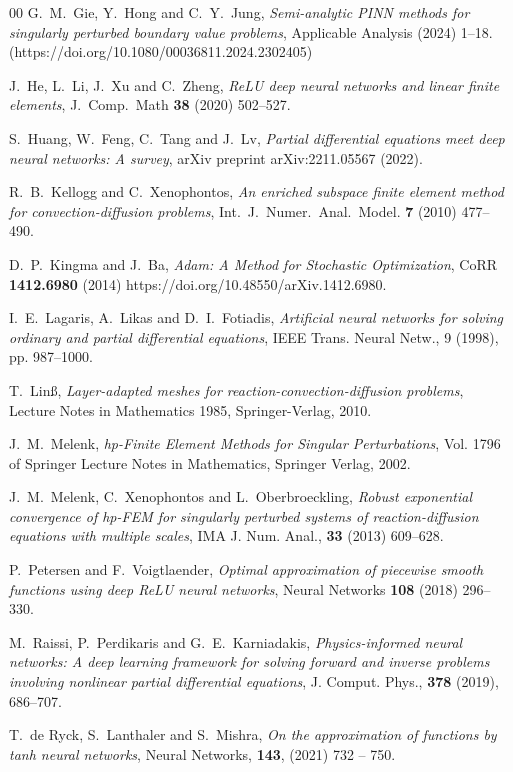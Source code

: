 \documentclass[11pt]{article}
\theoremstyle{plain}
\theoremstyle{definition}
\theoremstyle{remark}
\numberwithin{equation}{section}
\begin{document}
\begin{thebibliography}{00}
 G.~M.~Gie, Y.~Hong and C.~Y.~Jung, \emph{Semi-analytic PINN methods for 
singularly perturbed boundary value problems}, Applicable Analysis (2024) 1--18. 
(https://doi.org/10.1080/00036811.2024.2302405)

 J.~He, L.~Li, J.~Xu and C.~Zheng, \emph{ReLU deep neural networks and linear finite elements}, J.~Comp.~Math \textbf{38} (2020) 502--527.

S.~Huang, W.~Feng, C.~Tang and J.~Lv, 
\emph{Partial differential equations meet deep neural networks: A survey}, arXiv preprint arXiv:2211.05567 (2022).

R.~B.~Kellogg and C.~Xenophontos, \emph{An enriched subspace finite element method for convection-diffusion problems}, Int.~J.~Numer.~Anal.~Model. \textbf{7} (2010) 477--490.

 D.~P.~Kingma and J.~Ba, \emph{Adam: A Method for Stochastic Optimization}, CoRR \textbf{1412.6980} (2014) 
https://doi.org/10.48550/arXiv.1412.6980.

 I.~E.~Lagaris, A.~Likas and D.~I.~Fotiadis, \emph{Artificial neural networks for solving ordinary and partial differential equations}, IEEE Trans. Neural Netw., 9 (1998), pp. 987--1000.

 T.~Lin\ss , \emph{Layer-adapted meshes for
reaction-convection-diffusion problems}, Lecture Notes in Mathematics 1985,
Springer-Verlag, 2010.

 J.~M.~Melenk, \emph{hp-Finite Element Methods for Singular
Perturbations}, Vol. 1796 of Springer Lecture Notes in Mathematics, Springer
Verlag, 2002.

 J.~M.~Melenk, C.~Xenophontos and L.~Oberbroeckling, \emph{%
Robust exponential convergence of hp-FEM for singularly perturbed systems of
reaction-diffusion equations with multiple scales}, IMA J. Num. Anal., 
\textbf{33} (2013) 609--628.

P.~Petersen and F.~Voigtlaender, \emph{Optimal approximation of piecewise smooth functions
using deep ReLU neural networks}, Neural Networks \textbf{108} (2018) 296--330.

 M.~Raissi, P.~Perdikaris and G.~E.~Karniadakis, \emph{Physics-informed neural networks: A deep
learning framework for solving forward and inverse problems involving nonlinear partial differential
equations}, J. Comput. Phys., \textbf{378} (2019), 686--707.

 T.~de Ryck, S.~Lanthaler and S.~Mishra, \emph{On the approximation 
of functions by tanh neural networks}, Neural Networks, \textbf{143}, (2021) 732 -- 750.


\end{thebibliography}
\end{document}
